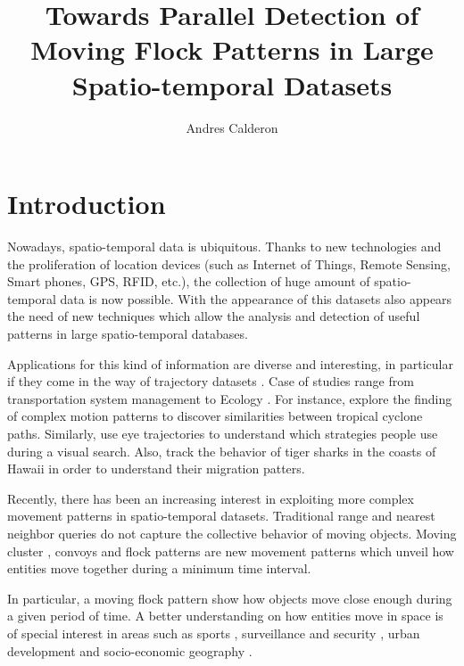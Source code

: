\documentclass[12pt]{scrartcl}
\title{Towards Parallel Detection of Moving Flock Patterns in Large Spatio-temporal Datasets}
\author{Andres Calderon}
\begin{document}
\maketitle
 
\section{Introduction}
Nowadays, spatio-temporal data is ubiquitous. Thanks to new technologies and the proliferation of location devices (such as Internet of Things, Remote Sensing, Smart phones, GPS, RFID, etc.), the collection of huge amount of spatio-temporal data is now possible. With the appearance of this datasets also appears the need of new techniques which allow the analysis and detection of useful patterns in large spatio-temporal databases.  

Applications for this kind of information are diverse and interesting, in particular if they come in the way of trajectory datasets \cite{jeung_trajectory_2011, huang_mining_2015}. Case of studies range from transportation system management \cite{di_lorenzo_allaboard:_2016,johansson_efficiency_2015} to Ecology \cite{johnston_abundance_2015, la_sorte_convergence_2016}.  For instance, \cite{turdukulov_visual_2014} explore the finding of complex motion patterns to discover similarities between tropical cyclone paths.  Similarly, \cite{amor_persistence_2016} use eye trajectories to understand which strategies people use during a visual search. Also, \cite{holland_movements_1999} track the behavior of tiger sharks in the coasts of Hawaii in order to understand their migration patters.

Recently, there has been an increasing interest in exploiting more complex movement patterns in spatio-temporal datasets.  Traditional range and nearest neighbor queries do not capture the collective behavior of moving objects.  Moving cluster \cite{kalnis_discovering_2005}, convoys \cite{jeung_discovery_2008} and flock patterns \cite{benkert_reporting_2008, gudmundsson_computing_2006} are new movement patterns which unveil how entities move together during a minimum time interval.  

In particular, a moving flock pattern show how objects move close enough during a given period of time.  A better understanding on how entities move in space is of special interest in areas such as sports \cite{iwase_tracking_2002},  surveillance and security \cite{makris_path_2002,piciarelli_trajectory_2005}, urban development \cite{huang_trajgraph:_2016, long_combining_2015} and socio-economic geography \cite{frank_life_2000}.
\end{document}
